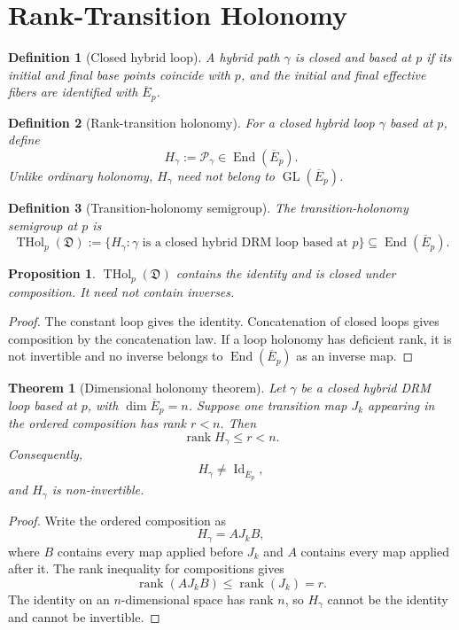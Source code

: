 \documentclass[11pt]{article}
\newtheorem{definition}{Definition}[section]
\newtheorem{theorem}{Theorem}[section]
\newtheorem{proposition}{Proposition}[section]
\newcommand{\Id}{\operatorname{Id}}
\newcommand{\rank}{\operatorname{rank}}
\newcommand{\THol}{\operatorname{THol}}
\newcommand{\End}{\operatorname{End}}
\newcommand{\GL}{\operatorname{GL}}
\begin{document}
\section{Rank-Transition Holonomy}
\label{sec:holonomy}

\begin{definition}[Closed hybrid loop]
A hybrid path $\gamma$ is closed and based at $p$ if its initial and final
base points coincide with $p$, and the initial and final effective fibers are
identified with $\overline E_p$.
\end{definition}

\begin{definition}[Rank-transition holonomy]
For a closed hybrid loop $\gamma$ based at $p$, define
\[
H_\gamma:=\mathcal P_\gamma\in\End(\overline E_p).
\]
Unlike ordinary holonomy, $H_\gamma$ need not belong to
$\GL(\overline E_p)$.
\end{definition}

\begin{definition}[Transition-holonomy semigroup]
The transition-holonomy semigroup at $p$ is
\[
\THol_p(\mathfrak D)
:=\{H_\gamma:\gamma\text{ is a closed hybrid DRM loop based at }p\}
\subseteq\End(\overline E_p).
\]
\end{definition}

\begin{proposition}
$\THol_p(\mathfrak D)$ contains the identity and is closed under composition.
It need not contain inverses.
\end{proposition}

\begin{proof}
The constant loop gives the identity. Concatenation of closed loops gives
composition by the concatenation law. If a loop holonomy has deficient rank,
it is not invertible and no inverse belongs to $\End(\overline E_p)$ as an
inverse map.
\end{proof}

\begin{theorem}[Dimensional holonomy theorem]
\label{thm:rank-holonomy}
Let $\gamma$ be a closed hybrid DRM loop based at $p$, with
$\dim\overline E_p=n$. Suppose one transition map $J_k$ appearing in the
ordered composition has rank $r<n$. Then
\[
\rank H_\gamma\le r<n.
\]
Consequently,
\[
H_\gamma\ne\Id_{\overline E_p},
\]
and $H_\gamma$ is non-invertible.
\end{theorem}

\begin{proof}
Write the ordered composition as
\[
H_\gamma=A J_k B,
\]
where $B$ contains every map applied before $J_k$ and $A$ contains every map
applied after it. The rank inequality for compositions gives
\[
\rank(AJ_kB)\le\rank(J_k)=r.
\]
The identity on an $n$-dimensional space has rank $n$, so $H_\gamma$ cannot be
the identity and cannot be invertible.
\end{proof}
\end{document}

